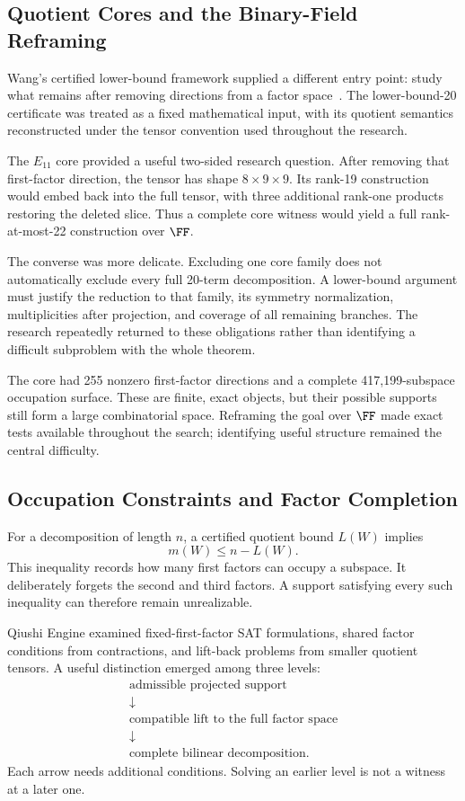 \subsection{Quotient Cores and the Binary-Field Reframing}\label{route:cores}

Wang's certified lower-bound framework supplied a different entry point:
study what remains after removing directions from a factor
space~\cite{wangautomated}. The lower-bound-20 certificate was treated
as a fixed mathematical input, with its quotient semantics reconstructed
under the tensor convention used throughout the research.

The $E_{11}$ core provided a useful two-sided research question.
After removing that first-factor direction, the tensor has shape
$8\times9\times9$. Its rank-19 construction would embed back into the
full tensor, with three additional rank-one products restoring the
deleted slice. Thus a complete core witness would yield a full
rank-at-most-22 construction over $\FF$.

The converse was more delicate. Excluding one core family does not
automatically exclude every full 20-term decomposition. A lower-bound
argument must justify the reduction to that family, its symmetry
normalization, multiplicities after projection, and coverage of all
remaining branches. The research repeatedly returned to these
obligations rather than identifying a difficult subproblem with the
whole theorem.

The core had 255 nonzero first-factor directions and a complete
417,199-subspace occupation surface. These are finite, exact objects,
but their possible supports still form a large combinatorial space.
Reframing the goal over $\FF$ made exact tests available throughout
the search; identifying useful structure remained the central difficulty.

\subsection{Occupation Constraints and Factor Completion}\label{route:completion}

For a decomposition of length $n$, a certified quotient bound $L(W)$
implies
\[
 m(W)\le n-L(W).
\]
This inequality records how many first factors can occupy a subspace.
It deliberately forgets the second and third factors. A support
satisfying every such inequality can therefore remain unrealizable.

Qiushi Engine examined fixed-first-factor SAT formulations, shared
factor conditions from contractions, and lift-back problems from
smaller quotient tensors. A useful distinction emerged among three
levels:
\[
 \begin{gathered}
 \text{admissible projected support}\\
 \downarrow\\
 \text{compatible lift to the full factor space}\\
 \downarrow\\
 \text{complete bilinear decomposition}.
 \end{gathered}
\]
Each arrow needs additional conditions. Solving an earlier level is
not a witness at a later one.

